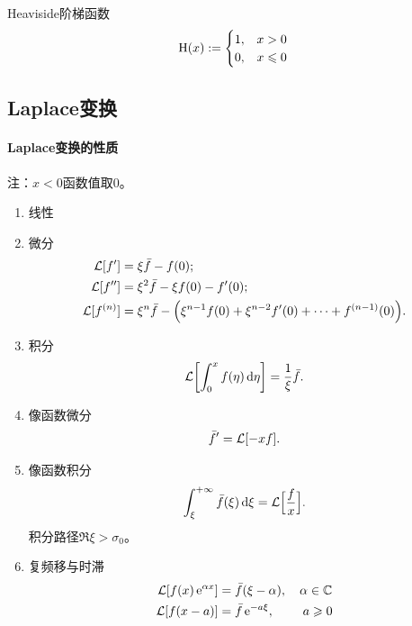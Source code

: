 Heaviside阶梯函数
\begin{equation}
	\label{eq:mmp-heaviside}
	\operatorname{H}(x) := \begin{cases}
	1,&x > 0\\
	0,&x \leqslant 0
	\end{cases}
\end{equation}
\subsection{Laplace变换}
\paragraph{Laplace变换的性质}注：$x < 0$函数值取0。
\begin{enumerate}
	\item 线性
	\item 微分
	\begin{subequations}
		\label{eq:mmp-laplace-derivatives}
		\begin{align}
			\operatorname{\mathcal L}[f'] &= \xi\bar f - f(0);\\
			\operatorname{\mathcal L}[f''] &= \xi^2\bar f - \xi f(0) - f'(0);\\
			\operatorname{\mathcal L}[f^{(n)}] &= \xi^n\bar f - \Bigl(\xi^{n-1}f(0) + \xi^{n-2}f'(0) + \cdots + f^{(n-1)}(0)\Bigr).
		\end{align}
	\end{subequations}
	\item 积分 
	\begin{equation}
		\label{eq:mmp-laplace-primitive}
		\operatorname{\mathcal L}\biggl[\int_0^xf(\eta)\mathop{}\!\mathrm{d}\eta\biggr] = \frac1\xi\bar f.
	\end{equation}
	\item 像函数微分
	\begin{equation}
		\label{eq:mmp-laplace-frequency-derivative}
		\bar f' = \operatorname{\mathcal L}[-xf].
	\end{equation}
	\item 像函数积分
	\begin{equation}
		\label{eq:mmp-laplace-frequency-primitive}
		\int_\xi^{+\infty}\bar f(\xi)\mathop{}\!\mathrm{d}\xi = \operatorname{\mathcal L}\Bigl[\frac fx\Bigr].
	\end{equation}
	积分路径$\Re\xi > \sigma_0$。
	\item 复频移与时滞
	\begin{subequations}
		\label{eq:mmp-laplace-shift}
		\begin{align}
			\LT[f(x)\e^{\alpha x}] &= \bar f(\xi - \alpha),\quad \alpha \in \CC\\
			\LT[f(x - a)] &= \bar f\e^{-a\xi},\qquad\; a \geqslant 0 %

\end{align}
\end{subequations}
\end{enumerate}
